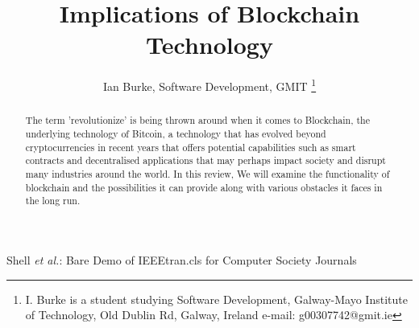 \documentclass[report]{IEEEtran}
\begin{document}
\title{Implications of Blockchain Technology}
\author{Ian Burke, Software Development, GMIT %
\thanks{I. Burke is a student studying
Software Development, Galway-Mayo Institute of Technology, Old Dublin Rd, Galway, Ireland e-mail: g00307742@gmit.ie}%
}

\maketitle

\begin{abstract}
The term 'revolutionize' is being thrown around when it comes to Blockchain, the underlying technology of Bitcoin, a technology that has evolved beyond cryptocurrencies in recent years that offers potential capabilities such as smart contracts and decentralised applications that may perhaps impact society and disrupt many industries around the world. In this review, We will examine the functionality of blockchain and the possibilities it can provide along with various obstacles it faces in the long run.
\end{abstract}

%
{Shell \MakeLowercase{\textit{et al.}}: Bare Demo of IEEEtran.cls for Computer Society Journals}
\end{document}

